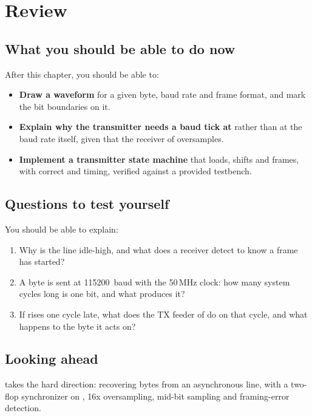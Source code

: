 
\section{Review}
\label{c2:sec:review}

\subsection*{What you should be able to do now}
After this chapter, you should be able to:
\begin{itemize}
  \item \textbf{Draw a  waveform} for a given byte, baud rate and frame format, and mark
    the bit boundaries on it.
  \item \textbf{Explain why the transmitter needs a baud tick at } rather than at
    the baud rate itself, given that the receiver of  oversamples.
  \item \textbf{Implement a transmitter state machine} that loads, shifts and frames, with correct
     and  timing, verified against a provided testbench.
\end{itemize}

\subsection*{Questions to test yourself}
You should be able to explain:
\begin{enumerate}
  \item Why is the line idle-high, and what does a receiver detect to know a frame has started?
  \item A byte is sent at 115200~baud with the 50\,MHz clock: how many system cycles long is one
    bit, and what  produces it?
  \item If  rises one cycle late, what does the TX feeder of  do on that
    cycle, and what happens to the byte it acts on?
\end{enumerate}

\subsection*{Looking ahead}
 takes the hard direction: recovering bytes from an asynchronous line, with a two-flop
synchronizer on , 16x oversampling, mid-bit sampling and framing-error detection.

